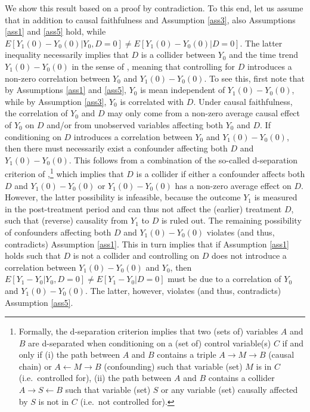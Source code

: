 {{		We show this result based on a proof by contradiction. To this end, let us assume that in addition to causal faithfulness and Assumption \ref{ass3},  also Assumptions \ref{ass1} and \ref{ass5} hold, while $E[Y_1(0)-Y_0(0)| Y_0, D=0]\neq E[Y_1(0)-Y_0(0)|D=0]$. The latter inequality necessarily implies that $D$ is a collider between $Y_0$ and the time trend $Y_1(0)-Y_0(0)$ in the sense of \citet{Pearl00}, meaning that controlling for $D$ introduces a non-zero correlation between $Y_0$ and $Y_1(0)-Y_0(0)$. To see this, first note that by Assumptions \ref{ass1} and \ref{ass5}, $Y_0$ is mean independent of $Y_1(0)-Y_0(0)$, while by Assumption \ref{ass3}, $Y_0$ is correlated with $D$. Under causal faithfulness, the correlation of $Y_0$ and $D$ may only come from a non-zero average causal effect of $Y_0$ on $D$ and/or from unobserved variables affecting both $Y_0$ and $D$. If conditioning on $D$ introduces a correlation between $Y_0$ and $Y_1(0)-Y_0(0)$, then there must necessarily exist a confounder affecting both $D$ and $Y_1(0)-Y_0(0)$. This follows from a combination of the so-called d-separation criterion of \citet{pearl1988probabilistic},\footnote{Formally, the d-separation criterion implies that two (sets of) variables $A$ and $B$ are d-separated when conditioning on a (set of) control variable(s) $C$ if and only if (i) the path between $A$ and $B$ contains a triple $A\rightarrow M \rightarrow B$ (causal chain) or $A\leftarrow M \rightarrow B$ (confounding) such that variable (set) $M$ is in $C$ (i.e.\ controlled for), (ii) the path between $A$ and $B$ contains a collider $A\rightarrow  S  \leftarrow B$ such that variable (set) $S$ or any variable (set) causally affected by $S$ is not in $C$ (i.e.\ not controlled for).} which implies that $D$ is a collider if either a confounder affects both $D$ and $Y_1(0)-Y_0(0)$ or $Y_1(0)-Y_0(0)$ has a non-zero average effect on $D$. However, the latter possibility is infeasible, because the outcome $Y_1$ is measured in the post-treatment period and can thus not affect the (earlier) treatment $D$, such that (reverse) causality from $Y_1$ to $D$ is ruled out. The remaining possibility of confounders affecting both $D$ and $Y_1(0)-Y_0(0)$ violates (and thus, contradicts) Assumption \ref{ass1}. This in turn implies that if Assumption \ref{ass1} holds such that $D$ is not a collider and controlling on $D$ does not introduce a correlation between $Y_1(0)-Y_0(0)$ and $Y_0$, then $E[Y_1-Y_0|Y_0,D=0]\neq E[Y_1-Y_0|D=0]$ must be due to a correlation of $Y_0$ and $Y_1(0)-Y_0(0)$. The latter, however, violates (and thus, contradicts) Assumption \ref{ass5}.
		
}}
